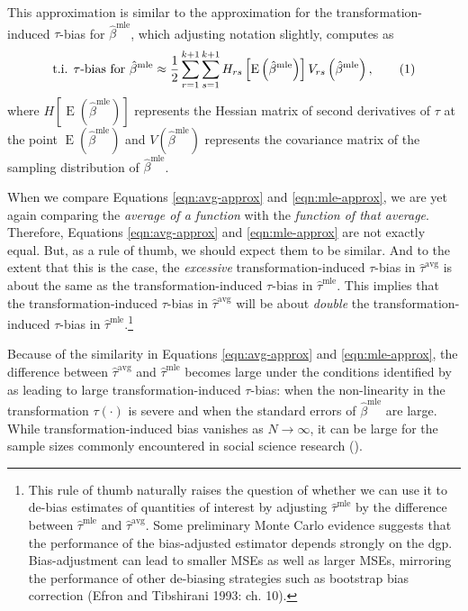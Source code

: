 \documentclass[11pt]{article}
\newcommand\numberthis{\addtocounter{equation}{1}\tag{\theequation}}
\DeclareMathOperator*{\E}{\text{E}}
\begin{document}
This approximation is similar to the approximation for the transformation-induced $\tau$-bias for $\hat{\beta}^\text{mle}$, which adjusting notation slightly, \citet[p. 405, Eq. 1]{Rainey2017} computes as
\begin{align*}
\text{t.i. } \tau \text{-bias for } \hat{\beta}^\text{mle} \approx \dfrac{1}{2} \displaystyle \sum_{r = 1}^{k+1} \sum_{s = 1}^{k+1} H_{rs}\left[ \E \left( \hat{\beta}^\text{mle} \right) \right] V_{rs} \left( \hat{\beta}^{\text{mle}} \right), \numberthis \label{eqn:mle-approx}
\end{align*}
where $H\left[ \E \left( \hat{\beta}^\text{mle} \right) \right]$ represents the Hessian matrix of second derivatives of $\tau$ at the point $\E \left( \hat{\beta}^\text{mle} \right)$ and $V \left( \hat{\beta}^{\text{mle}} \right)$ represents the covariance matrix of the sampling distribution of $\hat{\beta}^\text{mle}$.

When we compare Equations \ref{eqn:avg-approx} and \ref{eqn:mle-approx}, we are yet again comparing the \textit{average of a function} with the \textit{function of that average}. Therefore, Equations \ref{eqn:avg-approx} and \ref{eqn:mle-approx} are not exactly equal. But, as a rule of thumb, we should expect them to be similar. And to the extent that this is the case, the \emph{excessive} transformation-induced $\tau$-bias in $\hat{\tau}^\text{avg}$ is about the same as the transformation-induced $\tau$-bias in $\hat{\tau}^\text{mle}$. This implies that the transformation-induced $\tau$-bias in $\hat{\tau}^\text{avg}$ will be about \emph{double} the transformation-induced $\tau$-bias in $\hat{\tau}^\text{mle}$.\footnote{This rule of thumb naturally raises the question of whether we can use it to de-bias estimates of quantities of interest by adjusting $\hat{\tau}^\text{mle}$ by the difference between $\hat{\tau}^\text{mle}$ and $\hat{\tau}^\text{avg}$. Some preliminary Monte Carlo evidence suggests that the performance of the bias-adjusted estimator depends strongly on the dgp. Bias-adjustment can lead to smaller MSEs as well as larger MSEs, mirroring the performance of other de-biasing strategies such as bootstrap bias correction (Efron and Tibshirani 1993: ch. 10).}

Because of the similarity in Equations \ref{eqn:avg-approx} and \ref{eqn:mle-approx}, the difference between $\hat{\tau}^\text{avg}$ and $\hat{\tau}^\text{mle}$ becomes large under the conditions identified by \cite{Rainey2017} as leading to large transformation-induced $\tau$-bias: when the non-linearity in the transformation $\tau(\cdot)$ is severe and when the standard errors of $\hat{\beta}^\text{mle}$ are large. While transformation-induced bias vanishes as $N \to\infty$, it can be large for the sample sizes commonly encountered in social science research (\cite{Rainey2017}).
\end{document}
